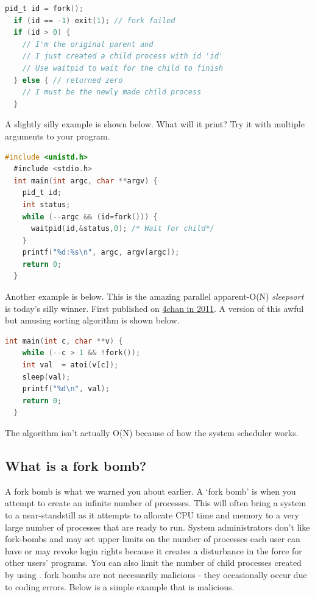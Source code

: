 \begin{lstlisting}[language=C]
  pid_t id = fork();
  if (id == -1) exit(1); // fork failed
  if (id > 0) {
    // I'm the original parent and
    // I just created a child process with id 'id'
    // Use waitpid to wait for the child to finish
  } else { // returned zero
    // I must be the newly made child process
  }
\end{lstlisting}

A slightly silly example is shown below. What will it print? Try it with multiple arguments to your program.

\begin{lstlisting}[language=C]
  #include <unistd.h>
  #include <stdio.h>
  int main(int argc, char **argv) {
    pid_t id;
    int status;
    while (--argc && (id=fork())) {
      waitpid(id,&status,0); /* Wait for child*/
    }
    printf("%d:%s\n", argc, argv[argc]);
    return 0;
  }
\end{lstlisting}

Another example is below.
This is the amazing parallel apparent-O(N) \emph{sleepsort} is today's silly winner. First published on \href{https://dis.4chan.org/read/prog/1295544154}{4chan in 2011}. A version of this awful but amusing sorting algorithm is shown below.

\begin{lstlisting}[language=C]
  int main(int c, char **v) {
    while (--c > 1 && !fork());
    int val  = atoi(v[c]);
    sleep(val);
    printf("%d\n", val);
    return 0;
  }
\end{lstlisting}

The algorithm isn't actually O(N) because of how the system scheduler works.

\subsection{What is a fork bomb?}

A fork bomb is what we warned you about earlier.
A `fork bomb' is when you attempt to create an infinite number of processes.
This will often bring a system to a near-standstill as it attempts to allocate CPU time and memory to a very large number of processes that are ready to run.
System administrators don't like fork-bombs and may set upper limits on the number of processes each user can have or may revoke login rights because it creates a disturbance in the force for other users' programs.
You can also limit the number of child processes created by using . fork bombs are not necessarily malicious - they occasionally occur due to coding errors.
Below is a simple example that is malicious.

